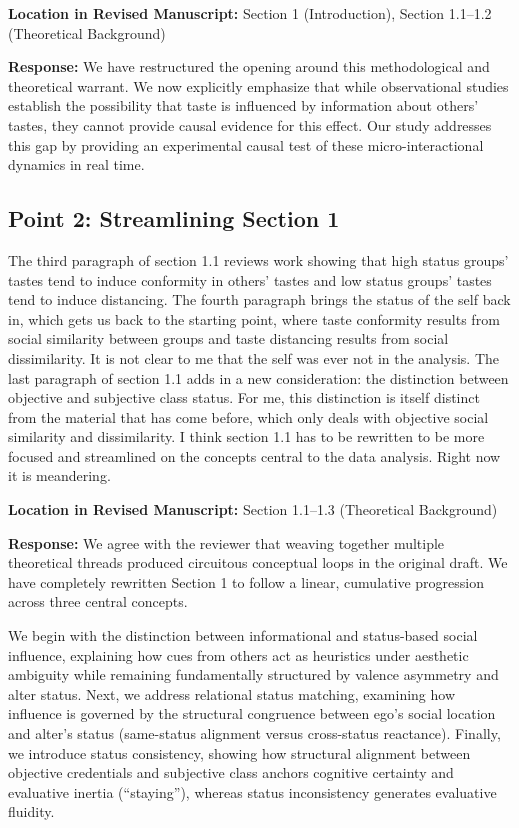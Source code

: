 \documentclass[11pt, letterpaper]{article}
\begin{document}
\textbf{Location in Revised Manuscript:} Section 1 (Introduction), Section 1.1--1.2 (Theoretical Background)

\textbf{Response:}
We have restructured the opening around this methodological and theoretical warrant. We now explicitly emphasize that while observational studies establish the possibility that taste is influenced by information about others' tastes, they cannot provide causal evidence for this effect. Our study addresses this gap by providing an experimental causal test of these micro-interactional dynamics in real time.

\vspace{10pt}

\subsection*{Point 2: Streamlining Section 1}

\begin{reviewercomment}
The third paragraph of section 1.1 reviews work showing that high status groups' tastes tend to induce conformity in others' tastes and low status groups' tastes tend to induce distancing. The fourth paragraph brings the status of the self back in, which gets us back to the starting point, where taste conformity results from social similarity between groups and taste distancing results from social dissimilarity. It is not clear to me that the self was ever not in the analysis. The last paragraph of section 1.1 adds in a new consideration: the distinction between objective and subjective class status. For me, this distinction is itself distinct from the material that has come before, which only deals with objective social similarity and dissimilarity. I think section 1.1 has to be rewritten to be more focused and streamlined on the concepts central to the data analysis. Right now it is meandering.
\end{reviewercomment}

\textbf{Location in Revised Manuscript:} Section 1.1--1.3 (Theoretical Background)

\textbf{Response:}
We agree with the reviewer that weaving together multiple theoretical threads produced circuitous conceptual loops in the original draft. We have completely rewritten Section 1 to follow a linear, cumulative progression across three central concepts.

We begin with the distinction between informational and status-based social influence, explaining how cues from others act as heuristics under aesthetic ambiguity while remaining fundamentally structured by valence asymmetry and alter status. Next, we address relational status matching, examining how influence is governed by the structural congruence between ego's social location and alter's status (same-status alignment versus cross-status reactance). Finally, we introduce status consistency, showing how structural alignment between objective credentials and subjective class anchors cognitive certainty and evaluative inertia (``staying''), whereas status inconsistency generates evaluative fluidity.
\end{document}

